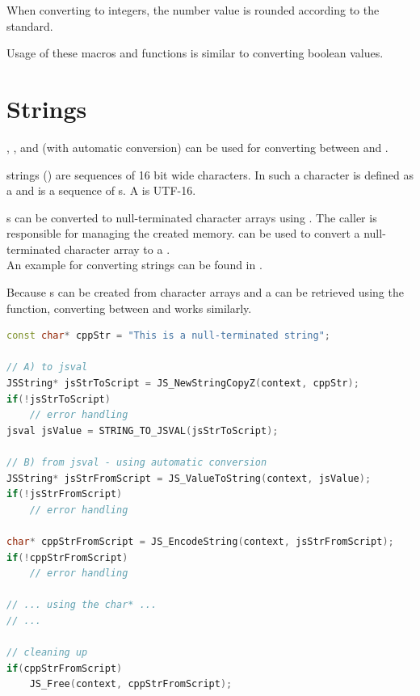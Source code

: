 When converting to integers, the number value is rounded according to the \linebreak{} standard.

Usage of these macros and functions is similar to converting boolean values.

\section{Strings}

, ,  and  (with automatic conversion) can be used for converting between  and .

 strings () are sequences of 16 bit wide characters. In \linebreak{} such a character is defined as a  and  is a sequence of s. A  is UTF-16.

s can be converted to null-terminated  character arrays using \linebreak{}. The caller is responsible for managing the created memory. \linebreak{} can be used to convert a null-terminated character array to a .\\
An example for converting strings can be found in .

Because s can be created from character arrays and a  can be retrieved using the  function, converting between  and  works similarly.

\SingleSpacing
\begin{lstlisting}[language=C++, caption=Conversion of strings, label=lst:ConvertStrings]
const char* cppStr = "This is a null-terminated string";

// A) to jsval
JSString* jsStrToScript = JS_NewStringCopyZ(context, cppStr);
if(!jsStrToScript)
	// error handling
jsval jsValue = STRING_TO_JSVAL(jsStrToScript);

// B) from jsval - using automatic conversion
JSString* jsStrFromScript = JS_ValueToString(context, jsValue);
if(!jsStrFromScript)
	// error handling
	
char* cppStrFromScript = JS_EncodeString(context, jsStrFromScript);
if(!cppStrFromScript)
	// error handling
	
// ... using the char* ...
// ...

// cleaning up
if(cppStrFromScript)
	JS_Free(context, cppStrFromScript);
\end{lstlisting}
\OnehalfSpacing

